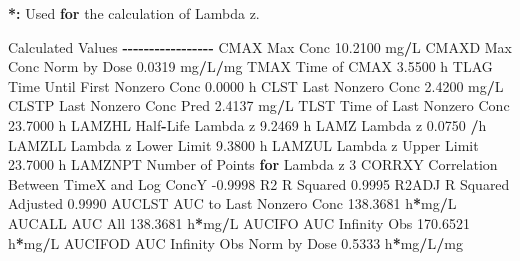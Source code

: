 \documentclass[
  12pt,
]{krantz}
\newenvironment{Shaded}{\begin{snugshade}}{\end{snugshade}}
\newcommand{\ControlFlowTok}[1]{\textcolor[rgb]{0.13,0.29,0.53}{\textbf{#1}}}
\newcommand{\DecValTok}[1]{\textcolor[rgb]{0.00,0.00,0.81}{#1}}
\newcommand{\ErrorTok}[1]{\textcolor[rgb]{0.64,0.00,0.00}{\textbf{#1}}}
\newcommand{\FloatTok}[1]{\textcolor[rgb]{0.00,0.00,0.81}{#1}}
\newcommand{\NormalTok}[1]{#1}
\newcommand{\OperatorTok}[1]{\textcolor[rgb]{0.81,0.36,0.00}{\textbf{#1}}}
\newcommand{\StringTok}[1]{\textcolor[rgb]{0.31,0.60,0.02}{#1}}
\begin{document}
\begin{Shaded}
\begin{Highlighting}[]
\OperatorTok{*}\ErrorTok{:}\StringTok{ }\NormalTok{Used }\ControlFlowTok{for}\NormalTok{ the calculation of Lambda z.}


\NormalTok{Calculated Values}
\OperatorTok{{-}{-}{-}{-}{-}{-}{-}{-}{-}{-}{-}{-}{-}{-}{-}{-}{-}}
\NormalTok{CMAX       Max Conc                                       }\FloatTok{10.2100}\NormalTok{ mg}\OperatorTok{/}\NormalTok{L}
\NormalTok{CMAXD      Max Conc Norm by Dose                           }\FloatTok{0.0319}\NormalTok{ mg}\OperatorTok{/}\NormalTok{L}\OperatorTok{/}\NormalTok{mg}
\NormalTok{TMAX       Time of CMAX                                    }\FloatTok{3.5500}\NormalTok{ h}
\NormalTok{TLAG       Time Until First Nonzero Conc                   }\FloatTok{0.0000}\NormalTok{ h}
\NormalTok{CLST       Last Nonzero Conc                               }\FloatTok{2.4200}\NormalTok{ mg}\OperatorTok{/}\NormalTok{L}
\NormalTok{CLSTP      Last Nonzero Conc Pred                          }\FloatTok{2.4137}\NormalTok{ mg}\OperatorTok{/}\NormalTok{L}
\NormalTok{TLST       Time of Last Nonzero Conc                      }\FloatTok{23.7000}\NormalTok{ h}
\NormalTok{LAMZHL     Half}\OperatorTok{{-}}\NormalTok{Life Lambda z                              }\FloatTok{9.2469}\NormalTok{ h}
\NormalTok{LAMZ       Lambda z                                        }\FloatTok{0.0750} \OperatorTok{/}\NormalTok{h}
\NormalTok{LAMZLL     Lambda z Lower Limit                            }\FloatTok{9.3800}\NormalTok{ h}
\NormalTok{LAMZUL     Lambda z Upper Limit                           }\FloatTok{23.7000}\NormalTok{ h}
\NormalTok{LAMZNPT    Number of Points }\ControlFlowTok{for}\NormalTok{ Lambda z                   }\DecValTok{3}
\NormalTok{CORRXY     Correlation Between TimeX and Log ConcY        }\FloatTok{{-}0.9998} 
\NormalTok{R2         R Squared                                       }\FloatTok{0.9995} 
\NormalTok{R2ADJ      R Squared Adjusted                              }\FloatTok{0.9990} 
\NormalTok{AUCLST     AUC to Last Nonzero Conc                      }\FloatTok{138.3681}\NormalTok{ h}\OperatorTok{*}\NormalTok{mg}\OperatorTok{/}\NormalTok{L}
\NormalTok{AUCALL     AUC All                                       }\FloatTok{138.3681}\NormalTok{ h}\OperatorTok{*}\NormalTok{mg}\OperatorTok{/}\NormalTok{L}
\NormalTok{AUCIFO     AUC Infinity Obs                              }\FloatTok{170.6521}\NormalTok{ h}\OperatorTok{*}\NormalTok{mg}\OperatorTok{/}\NormalTok{L}
\NormalTok{AUCIFOD    AUC Infinity Obs Norm by Dose                   }\FloatTok{0.5333}\NormalTok{ h}\OperatorTok{*}\NormalTok{mg}\OperatorTok{/}\NormalTok{L}\OperatorTok{/}\NormalTok{mg}

\end{Highlighting}
\end{Shaded}
\end{document}
